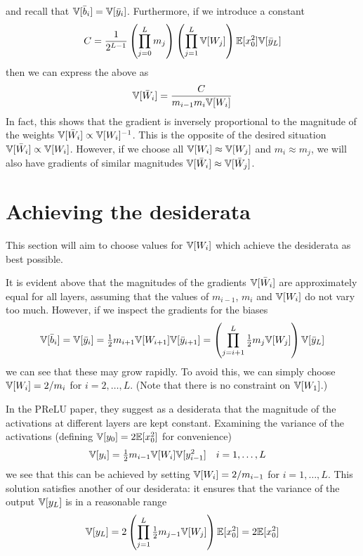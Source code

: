 and recall that $\mathbb{V}[\bar{b}_{i}] = \mathbb{V}[\bar{y}_{i}]$.
Furthermore, if we introduce a constant
\begin{equation}
C = \frac{1}{2^{L-1}} \left(\prod_{j=0}^{L} m_{j} \right) \left(\prod_{j=1}^{L} \mathbb{V}[W_{j}] \right)
  \mathbb{E}[x_{0}^2] \mathbb{V}[\bar{y}_{L}]
\end{equation}
then we can express the above as
\begin{equation}
\mathbb{V}[\bar{W}_{i}] = \frac{C}{m_{i-1} m_{i} \mathbb{V}[W_{i}]}
\end{equation}
In fact, this shows that the gradient is inversely proportional to the magnitude of the weights $\mathbb{V}[\bar{W}_{i}] \propto \mathbb{V}[W_{i}]^{-1}$.
This is the opposite of the desired situation $\mathbb{V}[\bar{W}_{i}] \propto \mathbb{V}[W_{i}]$.
However, if we choose all $\mathbb{V}[W_{i}] \approx \mathbb{V}[W_{j}]$ and $m_{i} \approx m_{j}$, we will also have gradients of similar magnitudes $\mathbb{V}[\bar{W}_{i}] \approx \mathbb{V}[\bar{W}_{j}]$.

\section{Achieving the desiderata}

This section will aim to choose values for $\mathbb{V}[W_{i}]$ which achieve the desiderata as best possible.

It is evident above that the magnitudes of the gradients $\mathbb{V}[\bar{W}_{i}]$ are approximately equal for all layers, assuming that the values of $m_{i-1}$, $m_{i}$ and $\mathbb{V}[W_{i}]$ do not vary too much.
However, if we inspect the gradients for the biases
\begin{equation}
\mathbb{V}[\bar{b}_{i}] = \mathbb{V}[\bar{y}_{i}] =\tfrac{1}{2} m_{i+1} \mathbb{V}[W_{i+1}] \mathbb{V}[\bar{y}_{i+1}] = \left( \prod_{j = i+1}^{L} \tfrac{1}{2} m_{j} \mathbb{V}[W_{j}] \right) \mathbb{V}[\bar{y}_{L}]
\end{equation}
we can see that these may grow rapidly.
To avoid this, we can simply choose $\mathbb{V}[W_{i}] = 2 / m_{i}$ for $i = 2, \dots, L$.
(Note that there is no constraint on $\mathbb{V}[W_{1}]$.)

In the PReLU paper, they suggest as a desiderata that the magnitude of the activations at different layers are kept constant.
Examining the variance of the activations (defining $\mathbb{V}[y_{0}] = 2 \mathbb{E}[x_{0}^2]$ for convenience)
\begin{align}
\mathbb{V}[y_{i}] & = \tfrac{1}{2} m_{i - 1} \mathbb{V}[W_{i}] \mathbb{V}[y_{i - 1}^2] && i = 1, \dots, L
\end{align}
we see that this can be achieved by setting $\mathbb{V}[W_{i}] = 2 / m_{i-1}$ for $i = 1, \dots, L$.
This solution satisfies another of our desiderata: it ensures that the variance of the output $\mathbb{V}[y_{L}]$ is in a reasonable range
\begin{equation}
\mathbb{V}[y_{L}] = 2 \left( \prod_{j = 1}^{L} \tfrac{1}{2} m_{j - 1} \mathbb{V}[W_{j}] \right) \mathbb{E}[x_{0}^2] = 2 \mathbb{E}[x_{0}^2]
\end{equation}

